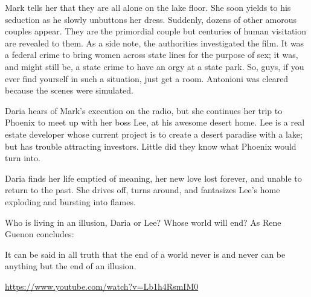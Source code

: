 Mark tells her that they are all alone on the lake floor. She soon yields to his seduction as he slowly unbuttons her
dress. Suddenly, dozens of other amorous couples appear. They are the primordial couple but centuries of human
visitation are revealed to them. As a side note, the authorities investigated the film. It was a federal crime to bring
women across state lines for the purpose of sex; it was, and might still be, a state crime to have an orgy at a state
park. So, guys, if you ever find yourself in such a situation, just get a room. Antonioni was cleared because the
scenes were simulated.

Daria hears of Mark's execution on the radio, but she continues her trip to Phoenix to meet up with
her boss Lee, at his awesome desert home. Lee is a real estate developer whose current project is to create a desert
paradise with a lake; but has trouble attracting investors. Little did they know what Phoenix would turn into.

Daria finds her life emptied of meaning, her new love lost forever, and unable to return to the past. She drives off,
turns around, and fantasizes Lee's home exploding and bursting into flames.

Who is living in an illusion, Daria or Lee? Whose world will end? As Rene Guenon concludes:

\begin{quotex}
It can be said in all truth that the end of a world never is and never can be anything but the end of an illusion.

\end{quotex}

\url{https://www.youtube.com/watch?v=Lb1h4RsmIM0}



